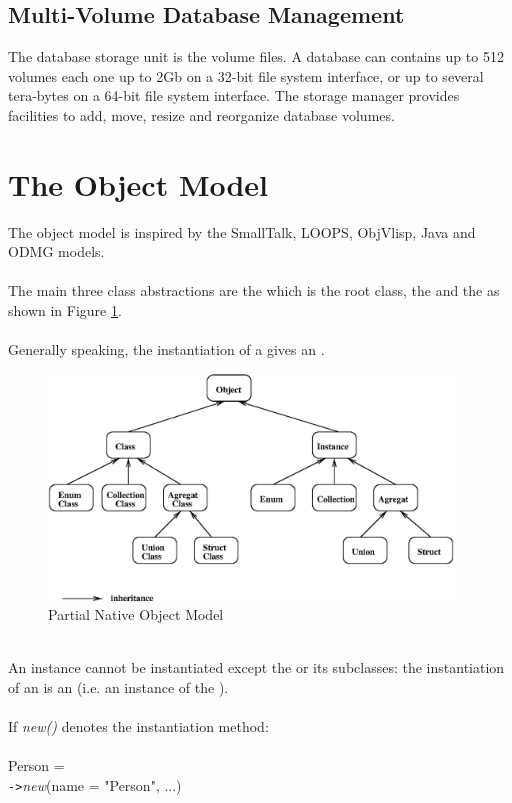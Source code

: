 \subsection{Multi-Volume Database Management}
The database storage unit is the volume files. A database can contains
up to 512 volumes each one up to 2Gb on a 32-bit file system interface,
or up to several tera-bytes on a 64-bit file system interface.
The storage manager provides facilities to add, move, resize and reorganize
database volumes.
\section{The Object Model}
The \eyedb object model is inspired by the SmallTalk, LOOPS, ObjVlisp, Java
and ODMG models.
\\
\\
The main three class abstractions are the  which is
the root class, the  and the  as shown in
Figure \ref{objmod}.
\\
\\
Generally speaking, the instantiation of a  gives an .
\begin{figure}[!th]
\centering
\includegraphics[height=60mm]{figures/objmod.eps}
\caption{Partial Native Object Model}
\label{objmod}
\end{figure}
\\
An instance cannot be instantiated except the  or its
subclasses: the instantiation of an  is an 
(i.e. an instance of the ).
\\
\\
If \emph{new()} denotes the instantiation method:
\\
\\
\ixx{} \textsf{Person} =\\
\ixy  {}\texttt{->}\emph{new}(name = "Person", ...)
